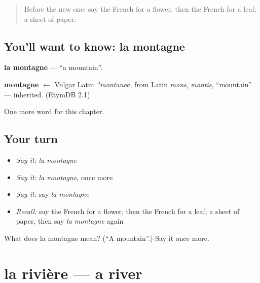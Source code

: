 \label{lesson:FR-C81-montagne}



\begin{quote}
Before the new one: say the French for a flower, then the French for a leaf; a sheet of paper.
\end{quote}

\subsection*{You'll want to know: la montagne}
\textbf{la montagne} — \textquotedblleft{}a mountain\textquotedblright{}.

\begin{cousinweb}
\textbf{montagne} $\leftarrow$ Vulgar Latin \emph{*montanea}, from Latin \emph{mons}, \emph{montis}, \textquotedblleft{}mountain\textquotedblright{} — inherited. (EtymDB 2.1)
\end{cousinweb}

\begin{grammarlens}[title={What you've built}]
One more word for this chapter.
\end{grammarlens}

\subsection*{Your turn}
\begin{itemize}
\raggedright
  \item \emph{Say it:} \emph{la montagne}
  \item \emph{Say it:} \emph{la montagne}, once more
  \item \emph{Say it:} say \emph{la montagne}
  \item \emph{Recall:} say the French for a flower, then the French for a leaf; a sheet of paper, then say \emph{la montagne} again
\end{itemize}

\begin{tcolorbox}[breakable,colback=teal!4,colframe=teal!35!black,title={Before you move on}]
What does la montagne mean? (\textquotedblleft{}A mountain\textquotedblright{}.) Say it once more.
\end{tcolorbox}
\section[la rivière]{la rivière — a river}

\label{lesson:FR-C81-riviere}



